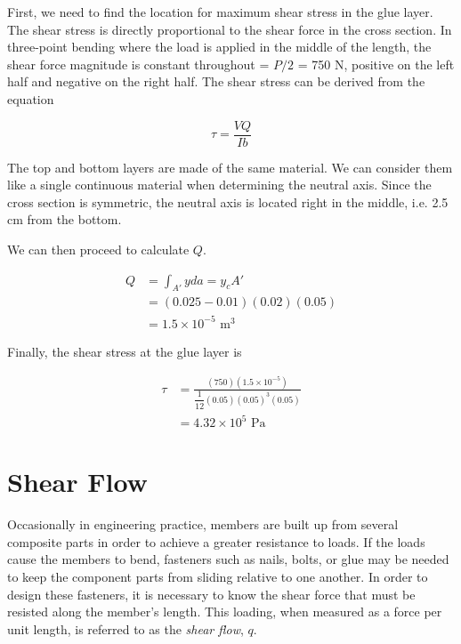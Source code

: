\documentclass[
10pt,
a4paper,
openany,
svgnames,
]{book} %
\begin{document}
\begin{solution}
  First, we need to find the location for maximum shear stress in the glue layer. The shear stress is directly proportional to the shear force in the cross section. In three-point bending where the load is applied in the middle of the length, the shear force magnitude is constant throughout = $P/2$ = 750 N, positive on the left half and negative on the right half. The shear stress can be derived from the equation

  \begin{equation*}
    \tau  = \frac{VQ}{Ib}
  \end{equation*}

  The top and bottom layers are made of the same material. We can consider them like a single continuous material when determining the neutral axis. Since the cross section is symmetric, the neutral axis is located right in the middle, i.e. 2.5 cm from the bottom.

  We can then proceed to calculate $Q$.

  \begin{align*}
    Q &= \int_{A'} yda = y_cA' \\
      &= (0.025 - 0.01)(0.02)(0.05) \\
      &= 1.5 \times 10^{-5} \text{ m}^3
  \end{align*}

  Finally, the shear stress at the glue layer is

  \begin{align*}
    \tau &= \frac{(750)(1.5 \times 10^{-5})}{\dfrac{1}{12}(0.05)(0.05)^3(0.05)} \\ 
         &= 4.32 \times 10^5 \text{ Pa}
  \end{align*}
\end{solution}
	
\section{Shear Flow}

Occasionally in engineering practice, members are built up from several composite parts in order to achieve a greater resistance to loads. If the loads cause the members to bend, fasteners such as nails, bolts, or glue may be needed to keep the component parts from sliding relative to one another. In order to design these fasteners, it is necessary to know the shear force that must be resisted along the member’s length. This loading, when measured as a force per unit length, is referred to as the \emph{shear flow}, $q$.
\end{document}
